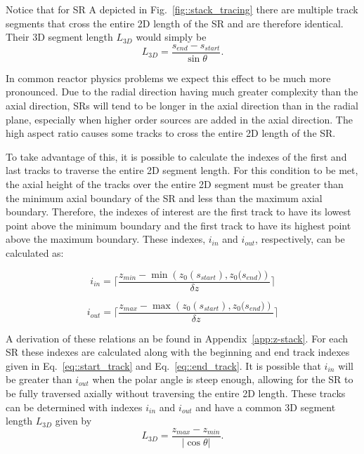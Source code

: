 Notice that for \ac{SR} A depicted in Fig.~\ref{fig::stack_tracing} there are multiple track segments that cross the entire 2D length of the \ac{SR} and are therefore identical. Their 3D segment length $L_{3D}$ would simply be
\begin{equation}
L_{3D} = \frac{s_{\textit{end}} - s_{\textit{start}}}{\sin{\theta}}.
\end{equation}

In common reactor physics problems we expect this effect to be much more pronounced. Due to the radial direction having much greater complexity than the axial direction, \ac{SR}s will tend to be longer in the axial direction than in the radial plane, especially when higher order sources are added in the axial direction. The high aspect ratio causes some tracks to cross the entire 2D length of the \ac{SR}.

To take advantage of this, it is possible to calculate the indexes of the first and last tracks to traverse the entire 2D segment length. For this condition to be met, the axial height of the tracks over the entire 2D segment must be greater than the minimum axial boundary of the \ac{SR} and less than the maximum axial boundary. Therefore, the indexes of interest are the first track to have its lowest point above the minimum boundary and the first track to have its highest point above the maximum boundary. These indexes, $i_{\textit{in}}$ and $i_{\textit{out}}$, respectively, can be calculated as:

\begin{equation}
i_{\textit{in}} = \Bigg\lceil\frac{z_{\textit{min}} - \min\left({z_0(s_{\textit{start}}), z_0(s_{\textit{end}}})\right) }{\delta z}\Bigg\rceil
\end{equation}

\begin{equation}
i_{\textit{out}} = \Bigg\lceil\frac{z_{\textit{max}} - \max\left({z_0(s_{\textit{start}}), z_0(s_{\textit{end}}})\right) }{\delta z}\Bigg\rceil
\end{equation}

A derivation of these relations an be found in Appendix~\ref{app:z-stack}. For each \ac{SR} these indexes are calculated along with the beginning and end track indexes given in Eq.~\ref{eq::start_track} and Eq.~\ref{eq::end_track}. It is possible that $i_{\textit{in}}$ will be greater than $i_{\textit{out}}$ when the polar angle is steep enough, allowing for the \ac{SR} to be fully traversed axially without traversing the entire 2D length. These tracks can be determined with indexes $i_{\textit{in}}$ and $i_{\textit{out}}$ and have a common 3D segment length $L_{3D}$ given by
\begin{equation}
L_{3D} = \frac{z_{\textit{max}} - z_{\textit{min}}}{\left| \cos{\theta}\right|}.
\end{equation}

